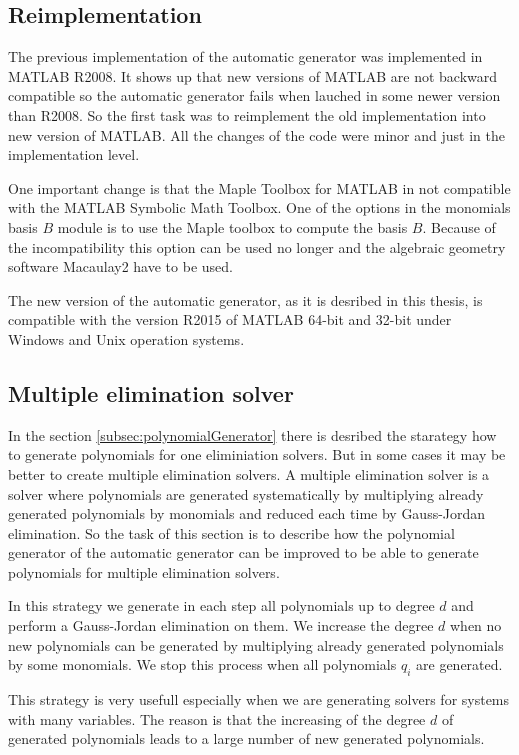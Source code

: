 \subsection{Reimplementation}
The previous implementation \cite{AutoGen} of the automatic generator was implemented in MATLAB R2008. It shows up that new versions of MATLAB are not backward compatible so the automatic generator fails when lauched in some newer version than R2008. So the first task was to reimplement the old implementation into new version of MATLAB. All the changes of the code were minor and just in the implementation level.

One important change is that the Maple Toolbox for MATLAB in not compatible with the MATLAB Symbolic Math Toolbox. One of the options in the monomials basis $B$ module is to use the Maple toolbox to compute the basis $B$. Because of the incompatibility this option can be used no longer and the algebraic geometry software Macaulay2 \cite{M2} have to be used.

The new version of the automatic generator, as it is desribed in this thesis, is compatible with the version R2015 of MATLAB 64-bit and 32-bit under Windows and Unix operation systems.

\subsection{Multiple elimination solver}
\label{subsec:multipleSolver}
In the section \ref{subsec:polynomialGenerator} there is desribed the starategy how to generate polynomials for one eliminiation solvers. But in some cases it may be better to create multiple elimination solvers. A multiple elimination solver is a solver where polynomials are generated systematically by multiplying already generated polynomials by monomials and reduced each time by Gauss-Jordan elimination. So the task of this section is to describe how the polynomial generator of the automatic generator can be improved to be able to generate polynomials for multiple elimination solvers.

In this strategy we generate in each step all polynomials up to degree $d$ and perform a Gauss-Jordan elimination on them. We increase the degree $d$ when no new polynomials can be generated by multiplying already generated polynomials by some monomials. We stop this process when all polynomials $q_i$ are generated. 

This strategy is very usefull especially when we are generating solvers for systems with many variables. The reason is that the increasing of the degree $d$ of generated polynomials leads to a large number of new generated polynomials.

